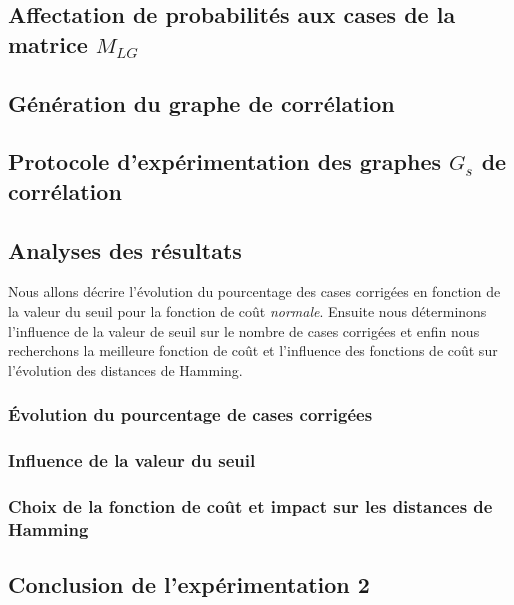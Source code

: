 	\subsection{Affectation de probabilit\'es aux cases de la matrice $M_{LG}$}
		\label{affectationValeursProbabilites}
		
	\subsection{G\'en\'eration du graphe de corr\'elation }
		\label{experimentation2GenerationMatriceProbabiliteAvecSeuil}
		
	\subsection{Protocole d'exp\'erimentation des graphes  $G_s$ de corr\'elation} 
		
	\subsection{Analyses des r\'esultats}
	Nous allons d\'ecrire l'\'evolution du pourcentage des cases corrig\'ees en fonction de la valeur du seuil pour la fonction de co\^ut {\em normale}. Ensuite nous d\'eterminons l'influence de la valeur de seuil sur le nombre de cases corrig\'ees et enfin nous recherchons la meilleure fonction de co\^ut et l'influence des fonctions de co\^ut sur l'\'evolution des distances de Hamming.
		\subsubsection{\'Evolution du pourcentage de cases corrig\'ees}
			
		\subsubsection{Influence de la valeur du seuil }
			
		\subsubsection{Choix de la fonction de co\^ut et impact sur les distances de Hamming }
			
	\subsection{Conclusion de l'exp\'erimentation 2}	
				

